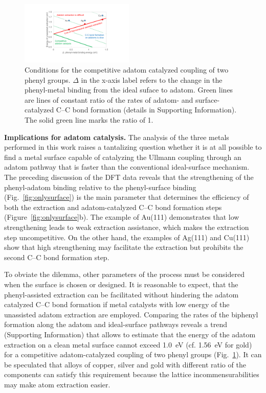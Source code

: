\documentclass[aps,prb,amsmath,amssymb,11pt]{revtex4-1}
\newcommand{\sinfo}{Supporting Information}
\begin{document}
\begin{figure}[bt]
\centering
\includegraphics[width=0.48\textwidth]{Fig/conclusion.pdf}
\caption{Conditions for the competitive adatom catalyzed coupling of two phenyl groups. $\Delta$ in the x-axis label refers to the change in the phenyl-metal binding from the ideal suface to adatom. Green lines are lines of constant ratio of the rates of adatom- and surface-catalyzed C--C bond formation (details in \sinfo). The solid green line marks the ratio of 1. %
} 
\label{fig:conclusion}
\end{figure}

\textbf{Implications for adatom catalysis.} 
%
The analysis of the three metals performed in this work raises a tantalizing question whether it is at all possible to find a metal surface capable of catalyzing the Ullmann coupling through an adatom pathway that is faster than the conventional ideal-surface mechanism. 
The preceding discussion of the DFT data reveals that the strengthening of the phenyl-adatom binding relative to the phenyl-surface binding (Fig.~\ref{fig:onlysurface}) is the main parameter that determines the efficiency of both the extraction and adatom-catalyzed C--C bond formation steps (Figure~\ref{fig:onlysurface}b).
The example of Au(111) demonstrates that low strengthening leads to weak extraction assistance, which makes the extraction step uncompetitive. On the other hand, the examples of Ag(111) and Cu(111) show that high strengthening may facilitate the extraction but prohibits the second C--C bond formation step. 

To obviate the dilemma, other parameters of the process must be considered when the surface is chosen or designed. It is reasonable to expect, that the phenyl-assisted extraction can be facilitated without hindering the adatom catalyzed C--C bond formation if metal catalysts with low energy of the unassisted adatom extraction are employed. 
%
Comparing the rates of the biphenyl formation along the adatom and ideal-surface pathways reveals a trend (\sinfo) that allows to estimate that the energy of the adatom extraction on a clean metal surface cannot exceed \SI{1.0}{\electronvolt} (cf. \SI{1.56}{\electronvolt} for gold) for a competitive adatom-catalyzed coupling of two phenyl groups (Fig.~\ref{fig:conclusion}).
It can be speculated that alloys of copper, silver and gold with different ratio of the components can satisfy this requirement because the lattice incommensurabilities may make atom extraction easier. 
\end{document}
